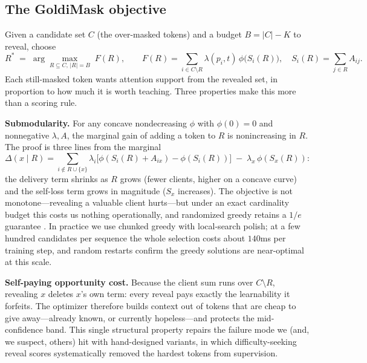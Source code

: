 \documentclass{article} %
\begin{document}
\subsection{The GoldiMask objective}

Given a candidate set $C$ (the over-masked tokens) and a budget $B = |C| - K$ to reveal, choose
\begin{equation}
R^\ast \;=\; \arg\max_{R \subseteq C,\, |R| = B}\; F(R), \qquad
F(R) = \sum_{i \in C \setminus R} \lambda(p_i, t)\,\phi\big(S_i(R)\big), \quad S_i(R) = \sum_{j \in R} A_{ij}.
\label{eq:objective}
\end{equation}
Each still-masked token wants attention support from the revealed set, in proportion to how much it is worth teaching. Three properties make this more than a scoring rule.

\textbf{Submodularity.} For any concave nondecreasing $\phi$ with $\phi(0)=0$ and nonnegative $\lambda, A$, the marginal gain of adding a token to $R$ is nonincreasing in $R$. The proof is three lines from the marginal
\[
\Delta(x \mid R) = \sum_{i \notin R \cup \{x\}} \lambda_i \big[\phi(S_i(R) + A_{ix}) - \phi(S_i(R))\big] \;-\; \lambda_x\, \phi(S_x(R)):
\]
the delivery term shrinks as $R$ grows (fewer clients, higher on a concave curve) and the self-loss term grows in magnitude ($S_x$ increases). The objective is not monotone---revealing a valuable client hurts---but under an exact cardinality budget this costs us nothing operationally, and randomized greedy retains a $1/e$ guarantee \citep{buchbinder2014submodular}. In practice we use chunked greedy with local-search polish; at a few hundred candidates per sequence the whole selection costs about $140$ms per training step, and random restarts confirm the greedy solutions are near-optimal at this scale.

\textbf{Self-paying opportunity cost.} Because the client sum runs over $C \setminus R$, revealing $x$ deletes $x$'s own term: every reveal pays exactly the learnability it forfeits. The optimizer therefore builds context out of tokens that are cheap to give away---already known, or currently hopeless---and protects the mid-confidence band. This single structural property repairs the failure mode we (and, we suspect, others) hit with hand-designed variants, in which difficulty-seeking reveal scores systematically removed the hardest tokens from supervision.
\end{document}
